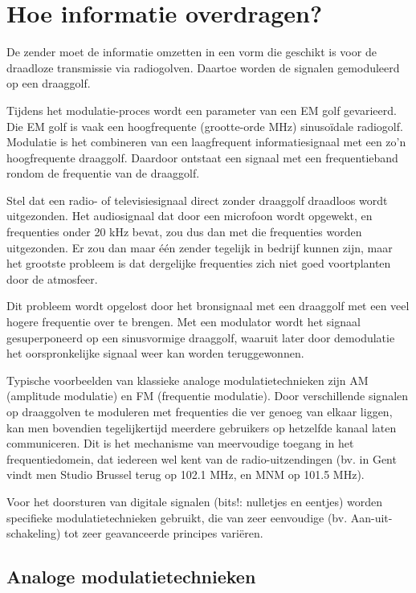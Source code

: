 \section{Hoe informatie overdragen?}

De zender moet de informatie omzetten in een vorm die geschikt is voor de draadloze transmissie via radiogolven. 
Daartoe worden de signalen gemoduleerd op een draaggolf.

Tijdens het modulatie-proces wordt een parameter van een EM golf gevarieerd. Die EM golf is vaak een hoogfrequente (grootte-orde MHz) sinuso\"idale radiogolf.
Modulatie is het combineren van een laagfrequent informatiesignaal met een zo'n hoogfrequente draaggolf. Daardoor ontstaat een signaal met een frequentieband rondom de frequentie van de draaggolf.

Stel dat een radio- of televisiesignaal direct zonder draaggolf draadloos wordt uitgezonden. Het audiosignaal dat door een microfoon wordt opgewekt, en frequenties onder 20 kHz bevat, zou dus dan met die frequenties worden uitgezonden. Er zou dan maar één zender tegelijk in bedrijf kunnen zijn, maar het grootste probleem is dat dergelijke frequenties zich niet goed voortplanten door de atmosfeer.

Dit probleem wordt opgelost door het bronsignaal met een draaggolf met een veel hogere frequentie over te brengen. Met een modulator wordt het signaal gesuperponeerd op een sinusvormige draaggolf, waaruit later door demodulatie het oorspronkelijke signaal weer kan worden teruggewonnen. 

Typische voorbeelden van klassieke analoge modulatietechnieken zijn AM (amplitude modulatie) en FM (frequentie modulatie). 
Door verschillende signalen op draaggolven te moduleren met frequenties die ver genoeg van elkaar liggen, kan men bovendien tegelijkertijd meerdere gebruikers op hetzelfde kanaal laten communiceren. 
Dit is het mechanisme van meervoudige toegang in het frequentiedomein, dat iedereen wel kent van de radio-uitzendingen (bv. in Gent vindt men Studio Brussel terug op 102.1 MHz, en MNM op 101.5 MHz).

Voor het doorsturen van digitale signalen (bits!: nulletjes en eentjes) worden specifieke modulatietechnieken gebruikt, die van zeer eenvoudige (bv. Aan-uit-schakeling) tot zeer geavanceerde principes vari\"eren.

\subsection{Analoge modulatietechnieken}

